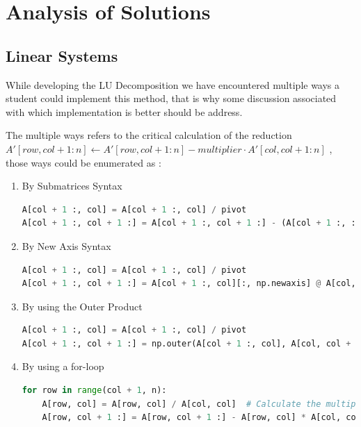 \chapter{Analysis of Solutions}
\section{Linear Systems}
While developing the LU Decomposition we have encountered multiple ways a student could implement this method, that is why some discussion associated with which implementation is better should be address.

The multiple ways refers to the critical calculation of the reduction $ A'[row, col+1:n] \gets A'[row, col+1:n] - multiplier \cdot A'[col, col+1:n] $ , those ways could be enumerated as :

\begin{enumerate}
    \item By Submatrices Syntax
    \begin{lstlisting}[language=Python]
A[col + 1 :, col] = A[col + 1 :, col] / pivot
A[col + 1 :, col + 1 :] = A[col + 1 :, col + 1 :] - (A[col + 1 :, :][:, [col]] @ A[[col], :][:, col + 1 :])
    \end{lstlisting}

    \item By New Axis Syntax
    \begin{lstlisting}[language=Python]
A[col + 1 :, col] = A[col + 1 :, col] / pivot
A[col + 1 :, col + 1 :] = A[col + 1 :, col][:, np.newaxis] @ A[col, col + 1 :][np.newaxis, :]
    \end{lstlisting}

    \item By using the Outer Product
    \begin{lstlisting}[language=Python]
A[col + 1 :, col] = A[col + 1 :, col] / pivot
A[col + 1 :, col + 1 :] = np.outer(A[col + 1 :, col], A[col, col + 1 :])
    \end{lstlisting}

    \item By using a for-loop
    \begin{lstlisting}[language=Python]
for row in range(col + 1, n):
    A[row, col] = A[row, col] / A[col, col]  # Calculate the multiplier and store in A for later use
    A[row, col + 1 :] = A[row, col + 1 :] - A[row, col] * A[col, col + 1 :]  # Update the remaining elements in the row using the multiplier
    \end{lstlisting} 
\end{enumerate}

